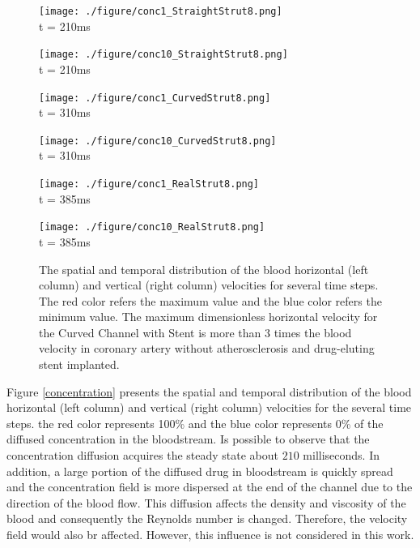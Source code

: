 \documentclass[10pt,fleqn,a4paper,twoside]{article}
\begin{document}
\begin{figure}[H]
\widefigure
     \begin{minipage}{.45\linewidth}
      \centering
      \texttt{[image: ./figure/conc1\_StraightStrut8.png]}\\
      t = 210ms
     \end{minipage}%
     \begin{minipage}{.45\linewidth}
      \centering
      \texttt{[image: ./figure/conc10\_StraightStrut8.png]}\\
      t = 210ms
     \end{minipage}
     \begin{minipage}{.45\linewidth}
     \medskip
      \centering
      \texttt{[image: ./figure/conc1\_CurvedStrut8.png]}\\
      t = 310ms
     \end{minipage}%
     \begin{minipage}{.45\linewidth}
     \medskip
      \centering
      \texttt{[image: ./figure/conc10\_CurvedStrut8.png]}\\
      t = 310ms
     \end{minipage}
     \begin{minipage}{.45\linewidth}
      \centering
      \texttt{[image: ./figure/conc1\_RealStrut8.png]}\\
      t = 385ms
     \end{minipage}%
     \begin{minipage}{.45\linewidth}
      \centering
      \texttt{[image: ./figure/conc10\_RealStrut8.png]}\\
      t = 385ms
     \end{minipage}
     \caption{
The spatial and temporal distribution 
of the blood horizontal (left
column) and vertical (right column) velocities for
several time steps. 
The red color refers the maximum value and 
the blue color refers the minimum value.
The maximum dimensionless horizontal
velocity for the Curved Channel with Stent is 
more than 3 times the blood velocity in coronary 
artery without atherosclerosis and
drug-eluting stent implanted.
}\label{velocity}
\end{figure}







\smallskip
Figure \ref{concentration} presents the spatial and 
temporal distribution of the blood horizontal (left
column) and vertical (right column) velocities for
the several time steps. 
the red color represents 100\% and 
the blue color represents 0\% of the diffused concentration
in the bloodstream. Is possible to observe that
the concentration diffusion acquires the steady state about
$210$ milliseconds. In addition, a large portion of
the diffused drug in bloodstream is quickly spread and
the concentration field is more dispersed at the end
of the channel due to the direction of the blood flow.
This diffusion affects the density and viscosity of
the blood and consequently the Reynolds number is changed. 
Therefore, the velocity field would also br affected. However,
this influence is not considered in this work.
\end{document}
